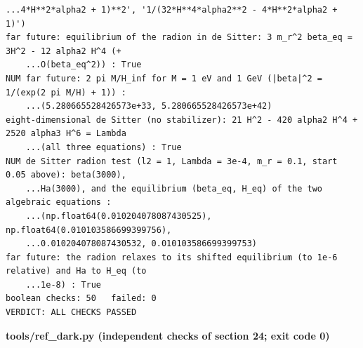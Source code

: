 \documentclass[10pt,a4paper]{article}
\begin{document}
\begin{Verbatim}[fontsize=\small,frame=single,framesep=2mm]
    ...4*H**2*alpha2 + 1)**2', '1/(32*H**4*alpha2**2 - 4*H**2*alpha2 + 1)')
far future: equilibrium of the radion in de Sitter: 3 m_r^2 beta_eq = 3H^2 - 12 alpha2 H^4 (+
    ...O(beta_eq^2)) : True
NUM far future: 2 pi M/H_inf for M = 1 eV and 1 GeV (|beta|^2 = 1/(exp(2 pi M/H) + 1)) :
    ...(5.280665528426573e+33, 5.280665528426573e+42)
eight-dimensional de Sitter (no stabilizer): 21 H^2 - 420 alpha2 H^4 + 2520 alpha3 H^6 = Lambda
    ...(all three equations) : True
NUM de Sitter radion test (l2 = 1, Lambda = 3e-4, m_r = 0.1, start 0.05 above): beta(3000),
    ...Ha(3000), and the equilibrium (beta_eq, H_eq) of the two algebraic equations :
    ...(np.float64(0.010204078087430525), np.float64(0.010103586699399756),
    ...0.010204078087430532, 0.010103586699399753)
far future: the radion relaxes to its shifted equilibrium (to 1e-6 relative) and Ha to H_eq (to
    ...1e-8) : True
boolean checks: 50   failed: 0
VERDICT: ALL CHECKS PASSED
\end{Verbatim}
\textbf{tools/ref\_dark.py (independent checks of section 24; exit code 0)}
\end{document}
